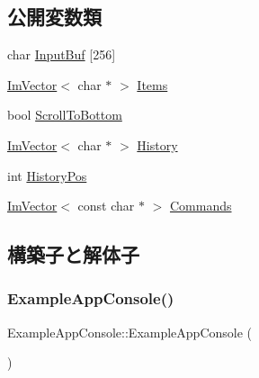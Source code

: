 \subsection*{公開変数類}
\begin{DoxyCompactItemize}
\item 
char \mbox{\hyperlink{struct_example_app_console_ab30accde81ae6833bd2ecf35f43f01ab}{Input\+Buf}} \mbox{[}256\mbox{]}
\item 
\mbox{\hyperlink{class_im_vector}{Im\+Vector}}$<$ char $\ast$ $>$ \mbox{\hyperlink{struct_example_app_console_acfde7d45fb733ac72d5d500168557b36}{Items}}
\item 
bool \mbox{\hyperlink{struct_example_app_console_a69b1406795fd71a3757761b0767ea1c5}{Scroll\+To\+Bottom}}
\item 
\mbox{\hyperlink{class_im_vector}{Im\+Vector}}$<$ char $\ast$ $>$ \mbox{\hyperlink{struct_example_app_console_a11c7fa54e744288f3606e4d6521d6345}{History}}
\item 
int \mbox{\hyperlink{struct_example_app_console_a2508db0a7d205947cea65b141d4ed589}{History\+Pos}}
\item 
\mbox{\hyperlink{class_im_vector}{Im\+Vector}}$<$ const char $\ast$ $>$ \mbox{\hyperlink{struct_example_app_console_a1eebee69cceb0345cf9d9b6e6beb9d03}{Commands}}
\end{DoxyCompactItemize}


\subsection{構築子と解体子}
\mbox{\label{struct_example_app_console_a405521e6aa8f97954b67315baf8d6147}} 
\subsubsection{\texorpdfstring{Example\+App\+Console()}{ExampleAppConsole()}}
{\footnotesize\ttfamily Example\+App\+Console\+::\+Example\+App\+Console (\begin{DoxyParamCaption}{ }\end{DoxyParamCaption})\hspace{0.3cm}{\ttfamily [inline]}}

\mbox{\label{struct_example_app_console_a91ef200056f867cf97a57db91bb991c4}} 
